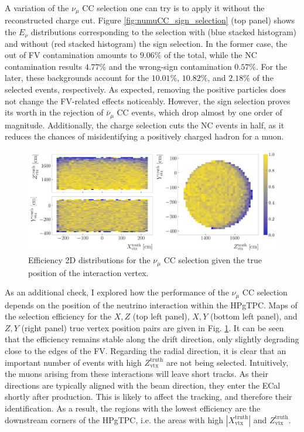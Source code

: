 A variation of the $\nu_{\mu}$ CC selection one can try is to apply it without the reconstructed charge cut. Figure \ref{fig:numuCC_sign_selection} (top panel) shows the $E_{\nu}$ distributions corresponding to the selection with (blue stacked histogram) and without (red stacked histogram) the sign selection. In the former case, the out of FV contamination amounts to $9.06\%$ of the total, while the NC contamination results $4.77\%$ and the wrong-sign contamination $0.57\%$. For the later, these backgrounds account for the $10.01\%$, $10.82\%$, and $2.18\%$ of the selected events, respectively. As expected, removing the positive particles does not change the FV-related effects noticeably. However, the sign selection proves its worth in the rejection of $\bar{\nu}_{\mu}$ CC events, which drop almost by one order of magnitude. Additionally, the charge selection cuts the NC events in half, as it reduces the chances of misidentifying a positively charged hadron for a muon.

\begin{figure}[t]
	\centering
	\includegraphics[width=.99\linewidth]{Images/GAr_selection/numuCC_selection_true_vertex_performance.pdf}
	\caption{Efficiency 2D distributions for the $\nu_{\mu}$ CC selection given the true position of the interaction vertex.}
	\label{fig:numuCC_vertex_efficiency}
\end{figure}

As an additional check, I explored how the performance of the $\nu_{\mu}$ CC selection depends on the position of the neutrino interaction within the HPgTPC. Maps of the selection efficiency for the $X,Z$ (top left panel), $X,Y$ (bottom left panel), and $Z,Y$ (right panel) true vertex position pairs are given in Fig. \ref{fig:numuCC_vertex_efficiency}. It can be seen that the efficiency remains stable along the drift direction, only slightly degrading close to the edges of the FV. Regarding the radial direction, it is clear that an important number of events with high $Z^{\mathrm{truth}}_{\mathrm{vtx}}$ are not being selected. Intuitively, the muons arising from these interactions will leave short tracks. As their directions are typically aligned with the beam direction, they enter the ECal shortly after production. This is likely to affect the tracking, and therefore their identification. As a result, the regions with the lowest efficiency are the downstream corners of the HPgTPC, i.e. the areas with high $|X^{\mathrm{truth}}_{\mathrm{vtx}}|$ and $Z^{\mathrm{truth}}_{\mathrm{vtx}}$.

